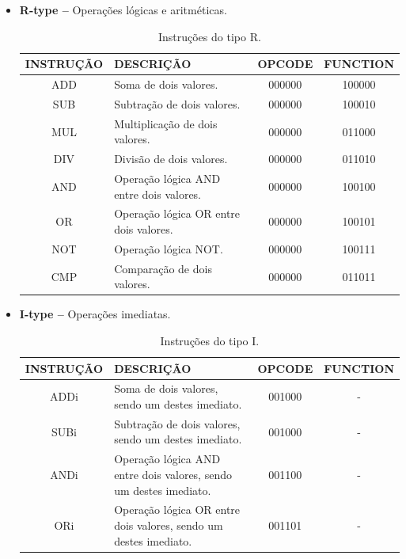 \documentclass{report}
\begin{document}
  \begin{itemize}
    \item \textbf{R-type --} Operações lógicas e aritméticas.
    
	\begin{table}[H]
	\centering
	\begin{tabular}{|c|m{6cm}|c|c|}
  	\hline 
  	\textbf{INSTRUÇÃO} & \textbf{DESCRIÇÃO} & \textbf{OPCODE} & \textbf{FUNCTION} \\ 
  	\hline 
  	ADD & Soma de dois valores. & 000000 & 100000 \\ \hline
  	SUB & Subtração de dois valores. & 000000 & 100010 \\ \hline
  	MUL & Multiplicação de dois valores. & 000000 & 011000 \\ \hline
  	DIV & Divisão de dois valores. & 000000 & 011010 \\ \hline
  	AND & Operação lógica AND entre dois valores. & 000000 & 100100 \\ \hline
  	OR & Operação lógica OR entre dois valores. & 000000 & 100101 \\ \hline
  	NOT & Operação lógica NOT. & 000000 & 100111 \\ \hline
  	CMP & Comparação de dois valores. & 000000 & 011011 \\ \hline
  	\end{tabular} 
  	\caption{Instruções do tipo R.}
  \end{table}    


    \item \textbf{I-type --} Operações imediatas.
    
	\begin{table}[H]
	\centering
	\begin{tabular}{|c|m{6cm}|c|c|}
  	\hline 
  	\textbf{INSTRUÇÃO} & \textbf{DESCRIÇÃO} & \textbf{OPCODE} & \textbf{FUNCTION} \\ 
  	\hline 
  	ADDi &  Soma de dois valores, sendo um destes imediato. & 001000 & - \\ \hline
  	SUBi & Subtração de dois valores, sendo um destes imediato. & 001000 & - \\ \hline
  	ANDi & Operação lógica AND entre dois valores, sendo um destes imediato. & 001100 & - \\ \hline
  	ORi & Operação lógica OR entre dois valores, sendo um destes imediato. & 001101 & - \\ \hline
  	\end{tabular} 
  	\caption{Instruções do tipo I.}
  \end{table}


\end{itemize}
\end{document}
